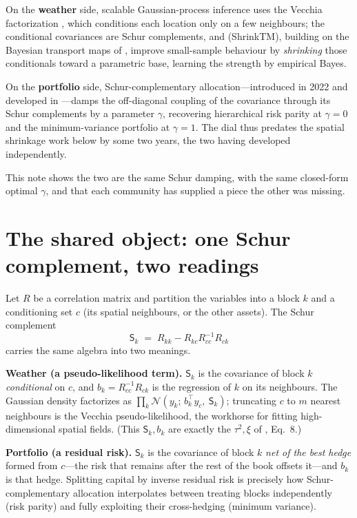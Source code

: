 \documentclass[11pt]{article}
\newcommand{\Nb}{\mathcal N}
\newcommand{\Sc}{\mathsf S}
\begin{document}
On the \textbf{weather} side, scalable Gaussian-process inference uses the Vecchia factorization
\citep{vecchia1988,katzfuss2021}, which conditions each location only on a few neighbours; the
conditional covariances are Schur complements, and \citet{chakraborty2025} (ShrinkTM), building on the
Bayesian transport maps of \citet{katzfuss2024}, improve small-sample behaviour by \emph{shrinking}
those conditionals toward a parametric base, learning the strength by empirical Bayes.

On the \textbf{portfolio} side, Schur-complementary allocation---introduced in 2022
\citep{cotton2022} and developed in \citet{cotton2024}---damps the off-diagonal coupling of the
covariance through its Schur complements by a parameter $\gamma$, recovering hierarchical risk parity
\citep{lopezdeprado2016} at $\gamma=0$ and the minimum-variance portfolio at $\gamma=1$. The dial thus
predates the spatial shrinkage work below by some two years, the two having developed independently.

This note shows the two are the same Schur damping, with the same closed-form optimal $\gamma$, and
that each community has supplied a piece the other was missing.

\section{The shared object: one Schur complement, two readings}
Let $R$ be a correlation matrix and partition the variables into a block $k$ and a conditioning set
$c$ (its spatial neighbours, or the other assets). The Schur complement
\begin{equation}\label{eq:schur}
  \Sc_k \;=\; R_{kk}-R_{kc}R_{cc}^{-1}R_{ck}
\end{equation}
carries the same algebra into two meanings.

\smallskip
\noindent\textbf{Weather (a pseudo-likelihood term).} $\Sc_k$ is the covariance of block $k$
\emph{conditional} on $c$, and $b_k=R_{cc}^{-1}R_{ck}$ is the regression of $k$ on its neighbours. The
Gaussian density factorizes as $\prod_k\Nb(y_k;\,b_k^\top y_c,\ \Sc_k)$; truncating $c$ to $m$ nearest
neighbours is the Vecchia pseudo-likelihood, the workhorse for fitting high-dimensional spatial fields.
(This $\Sc_k,b_k$ are exactly the $\tau^2,\xi$ of \citealp{chakraborty2025}, Eq.~8.)

\smallskip
\noindent\textbf{Portfolio (a residual risk).} $\Sc_k$ is the covariance of block $k$ \emph{net of the
best hedge} formed from $c$---the risk that remains after the rest of the book offsets it---and $b_k$
is that hedge. Splitting capital by inverse residual risk is precisely how Schur-complementary
allocation \citep{cotton2024} interpolates between treating blocks independently (risk parity) and
fully exploiting their cross-hedging (minimum variance).
\end{document}
